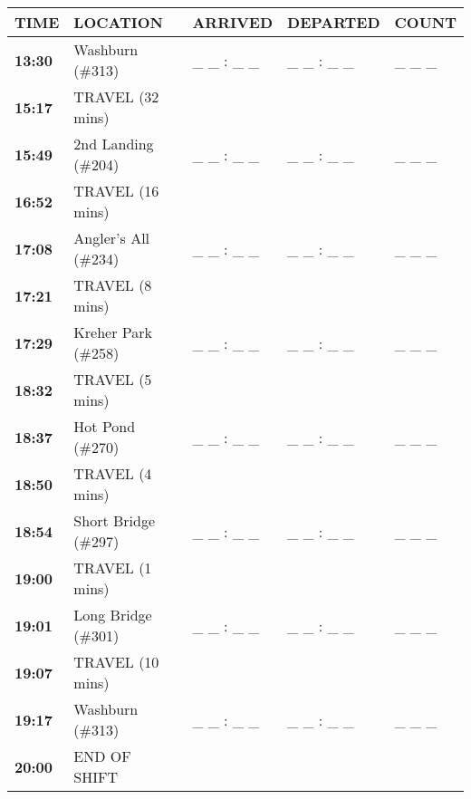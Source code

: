 \documentclass[]{article}
\begin{document}
\begin{tabular}{>{\bfseries}lllll}
\toprule
\textbf{TIME} & \textbf{LOCATION} & \textbf{ARRIVED} & \textbf{DEPARTED} & \textbf{COUNT}\\
\midrule
13:30 & Washburn (\#313) & \_ \_ : \_ \_ & \_ \_ : \_ \_ & \_ \_ \_\\
15:17 & TRAVEL (32 mins) &  &  & \\
15:49 & 2nd Landing (\#204) & \_ \_ : \_ \_ & \_ \_ : \_ \_ & \_ \_ \_\\
16:52 & TRAVEL (16 mins) &  &  & \\
17:08 & Angler's All (\#234) & \_ \_ : \_ \_ & \_ \_ : \_ \_ & \_ \_ \_\\
17:21 & TRAVEL (8 mins) &  &  & \\
17:29 & Kreher Park (\#258) & \_ \_ : \_ \_ & \_ \_ : \_ \_ & \_ \_ \_\\
18:32 & TRAVEL (5 mins) &  &  & \\
18:37 & Hot Pond (\#270) & \_ \_ : \_ \_ & \_ \_ : \_ \_ & \_ \_ \_\\
18:50 & TRAVEL (4 mins) &  &  & \\
18:54 & Short Bridge (\#297) & \_ \_ : \_ \_ & \_ \_ : \_ \_ & \_ \_ \_\\
19:00 & TRAVEL (1 mins) &  &  & \\
19:01 & Long Bridge (\#301) & \_ \_ : \_ \_ & \_ \_ : \_ \_ & \_ \_ \_\\
19:07 & TRAVEL (10 mins) &  &  & \\
19:17 & Washburn (\#313) & \_ \_ : \_ \_ & \_ \_ : \_ \_ & \_ \_ \_\\
20:00 & END OF SHIFT &  &  & \\
\bottomrule
\end{tabular}
\end{document}
